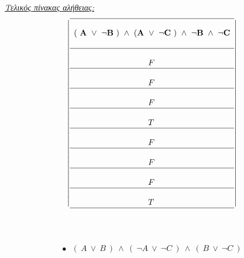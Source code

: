 \documentclass[10pt]{article}
\begin{document}
\underline{\it Τελικός πίνακας αλήθειας:}
\[ 
\left | 
\begin{array}{l}
 \hline  \\
 \bf  ( \ A \ \vee \ \neg B \ ) \ \wedge \ ( A \ 
\vee \ \neg C \ ) \ \wedge \ \neg B \ \wedge \ \neg C
\\  \\ 
\hline \\
\hspace{32mm}F \\
\hline \\
\hspace{32mm}F \\
\hline \\
\hspace{32mm}F \\
\hline \\
\hspace{32mm}T \\
\hline \\
\hspace{32mm}F \\
\hline \\
\hspace{32mm}F \\
\hline \\
\hspace{32mm}F \\
\hline \\
\hspace{32mm}T \\
\hline
\end{array} 
\right | \] 
\\ \\
% 


\vspace{5mm}

\[
\bullet \ \ \ ( \ A \ \vee \  B \ ) \ \wedge \ ( \ \neg A \ 
\vee \ \neg C \ ) \ \wedge \ ( \ B \ \vee \ \neg C \ ) \]
\end{document}
